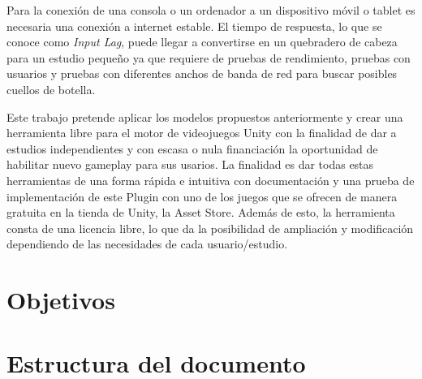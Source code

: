Para la conexi\'on de una consola o un ordenador a un dispositivo m\'ovil o tablet es necesaria una conexi\'on a internet estable. El tiempo de respuesta, lo que se conoce como  \textit{Input Lag}, puede llegar a convertirse en un quebradero de cabeza para un estudio peque\~no ya que requiere de pruebas de rendimiento, pruebas con usuarios y pruebas con diferentes anchos de banda de red para buscar posibles cuellos de botella. 

Este trabajo pretende aplicar los modelos propuestos anteriormente y crear una herramienta libre para el motor de videojuegos Unity con la finalidad de dar a estudios independientes y con escasa o nula financiaci\'on la oportunidad de habilitar nuevo gameplay para sus usarios. La finalidad es dar todas estas herramientas de una forma r\'apida e intuitiva con documentaci\'on y una prueba de implementaci\'on de este Plugin con uno de los juegos que se ofrecen de manera gratuita en la tienda de Unity, la Asset Store. Adem\'as de esto, la herramienta consta de una licencia libre, lo que da la posibilidad de ampliaci\'on y modificaci\'on dependiendo de las necesidades de cada usuario/estudio.

\section{Objetivos}




\section{Estructura del documento}



